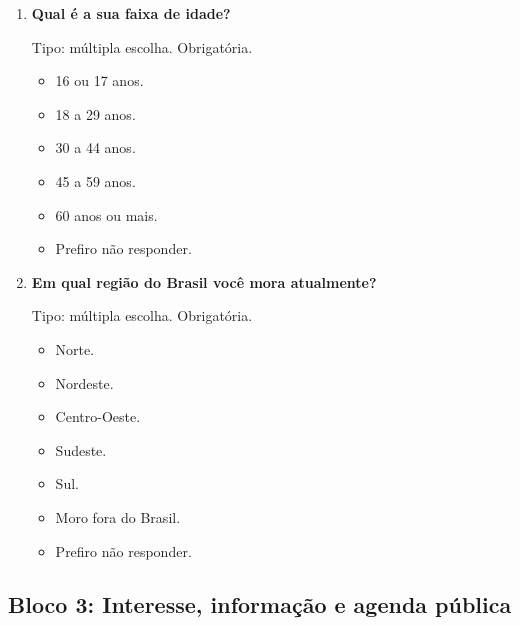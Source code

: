 \documentclass[11pt,a4paper]{article}
\begin{document}
\begin{enumerate}[resume]
\item \textbf{Qual é a sua faixa de idade?}

Tipo: múltipla escolha. Obrigatória.
\begin{itemize}
\item 16 ou 17 anos.
\item 18 a 29 anos.
\item 30 a 44 anos.
\item 45 a 59 anos.
\item 60 anos ou mais.
\item Prefiro não responder.
\end{itemize}

\item \textbf{Em qual região do Brasil você mora atualmente?}

Tipo: múltipla escolha. Obrigatória.
\begin{itemize}
\item Norte.
\item Nordeste.
\item Centro-Oeste.
\item Sudeste.
\item Sul.
\item Moro fora do Brasil.
\item Prefiro não responder.
\end{itemize}
\end{enumerate}

\subsection*{Bloco 3: Interesse, informação e agenda pública}
\end{document}
